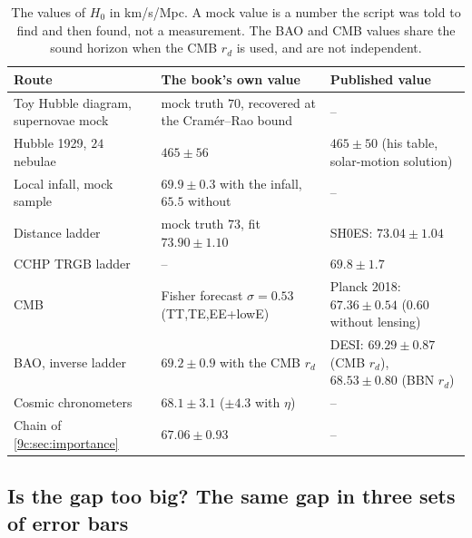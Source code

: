 \begin{table}[htbp]
\centering
\small
\renewcommand{\arraystretch}{1.25}
\begin{tabular}{@{}p{4.0cm}p{3.8cm}p{4.5cm}@{}}
\toprule
Route & The book's own value & Published value\\
\midrule
Toy Hubble diagram, supernovae mock & mock truth $70$, recovered at the Cram\'er--Rao bound & --\\
Hubble 1929, $24$ nebulae & $465\pm56$ & $465\pm50$ (his table, solar-motion solution)\\
Local infall, mock sample & $69.9\pm0.3$ with the infall, $65.5$ without & --\\
Distance ladder & mock truth $73$, fit $73.90\pm1.10$ & SH0ES: $73.04\pm1.04$\\
CCHP TRGB ladder & -- & $69.8\pm1.7$\\
CMB & Fisher forecast $\sigma=0.53$ (TT,TE,EE+lowE) & Planck 2018: $67.36\pm0.54$ ($0.60$ without lensing)\\
BAO, inverse ladder & $69.2\pm0.9$ with the CMB $r_d$ & DESI: $69.29\pm0.87$ (CMB $r_d$), $68.53\pm0.80$ (BBN $r_d$)\\
Cosmic chronometers & $68.1\pm3.1$ ($\pm4.3$ with $\eta$) & --\\
Chain of \cref{9c:sec:importance} & $67.06\pm0.93$ & --\\
\bottomrule
\end{tabular}
\caption{The values of $H_0$ in km/s/Mpc. A mock value is a number the script was told to
find and then found, not a measurement. The BAO and CMB values share the sound horizon when
the CMB $r_d$ is used, and are not independent.}
\label{11c:tab:h0-values}
\end{table}

\subsection{Is the gap too big? The same gap in three sets of error bars}
\label{11c:sec:h0-gap}


